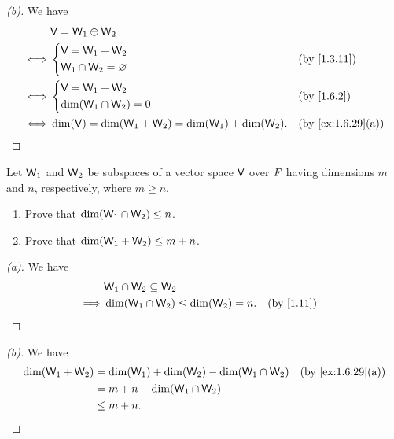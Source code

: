 \begin{proof}[(b)]
	We have
	\begin{align*}
		     & \V = \W_1 \oplus \W_2                                                          \\
		\iff & \begin{dcases}
			       \V = \W_1 + \W_2 \\
			       \W_1 \cap \W_2 = \varnothing
		       \end{dcases}                            &  & \by{1.3.11}                       \\
		\iff & \begin{dcases}
			       \V = \W_1 + \W_2 \\
			       \dim(\W_1 \cap \W_2) = 0
		       \end{dcases}                                &  & \by{1.6.2}                    \\
		\iff & \dim(\V) = \dim(\W_1 + \W_2) = \dim(\W_1) + \dim(\W_2). &  & \by{ex:1.6.29}[a]
	\end{align*}
\end{proof}

\setcounter{ex}{30}
\begin{ex}\label{ex:1.6.31}
	Let \(\mathsf{W}_1\) and \(\mathsf{W}_2\) be subspaces of a vector space \(\mathsf{V}\) over \(\mathit{F}\) having dimensions \(m\) and \(n\), respectively, where \(m \geq n\).
	\begin{enumerate}
		\item Prove that \(\dim(\mathsf{W}_1 \cap \mathsf{W}_2) \leq n\).
		\item Prove that \(\dim(\mathsf{W}_1 + \mathsf{W}_2) \leq m + n\).
	\end{enumerate}
\end{ex}

\begin{proof}[(a)]
	We have
	\begin{align*}
		         & \W_1 \cap \W_2 \subseteq \W_2                            \\
		\implies & \dim(\W_1 \cap \W_2) \leq \dim(\W_2) = n. &  & \by{1.11}
	\end{align*}
\end{proof}

\begin{proof}[(b)]
	We have
	\begin{align*}
		\dim(\W_1 + \W_2) & = \dim(\W_1) + \dim(\W_2) - \dim(\W_1 \cap \W_2) &  & \by{ex:1.6.29}[a] \\
		                  & = m + n - \dim(\W_1 \cap \W_2)                                          \\
		                  & \leq m + n.
	\end{align*}
\end{proof}

